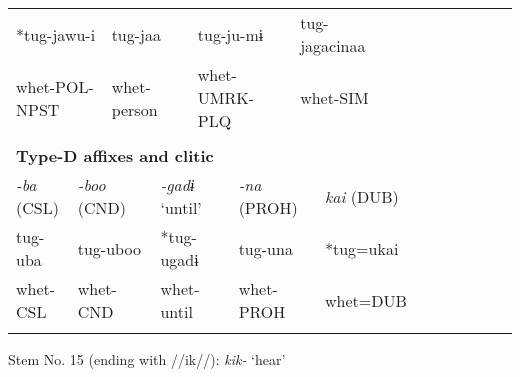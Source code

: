 \begin{tabularx}{\textwidth}{XXXXXXXXXXXXXXXXXXXX}
\multicolumn{3}{X}{{ *tug-jawu-i}} & \multicolumn{2}{X}{{ tug-jaa}} & \multicolumn{3}{X}{tug-ju-mɨ} & \multicolumn{4}{X}{{ tug-jagacinaa}} & \multicolumn{8}{X}{}\\
\multicolumn{3}{X}{whet-POL-NPST} & \multicolumn{2}{X}{whet-person} & \multicolumn{3}{X}{whet-UMRK-PLQ} & \multicolumn{4}{X}{whet-SIM} & \multicolumn{8}{X}{}\\
\multicolumn{20}{X}{}\\
\multicolumn{20}{X}{{\bfseries Type-D affixes and clitic}}\\
\multicolumn{2}{X}{{ \textit{{}-ba} (CSL)}} & \multicolumn{2}{X}{{ \textit{{}-boo} (CND)}} & \multicolumn{2}{X}{{ \textit{{}-gadɨ} ‘until’}} & \multicolumn{3}{X}{{ \textit{{}-na} (PROH)}} & \multicolumn{5}{X}{{ \textit{kai} (DUB)}} & \multicolumn{6}{X}{}\\
\multicolumn{2}{X}{{ tug-uba}} & \multicolumn{2}{X}{{ tug-uboo}} & \multicolumn{2}{X}{{ *tug-ugadɨ}} & \multicolumn{3}{X}{{ tug-una}} & \multicolumn{5}{X}{{ *tug=ukai}} & \multicolumn{6}{X}{}\\
\multicolumn{2}{X}{whet-CSL} & \multicolumn{2}{X}{whet-CND} & \multicolumn{2}{X}{whet-until} & \multicolumn{3}{X}{whet-PROH} & \multicolumn{5}{X}{whet=DUB} & \multicolumn{6}{X}{}\\
\lspbottomrule
\end{tabularx}
Stem No. 15 (ending with //ik//): \textit{kik-} ‘hear’

\tablefirsthead{}

